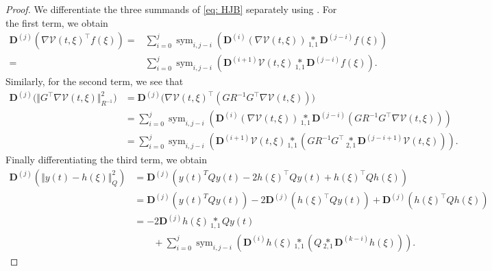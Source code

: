 \documentclass[10pt,a4paper]{amsart}
\DeclareMathOperator{\Sym}{sym}
\newcommand{\TenDeriv}[1]{\mathbf{D}^{(#1)}}
\newcommand{\tenp}[2]{\underset{#1,#2}{*}}
\begin{document}
\begin{proof}
  We differentiate the three summands of \eqref{eq: HJB} separately using . 
  For the first term, we obtain
  \begin{align*}
    \TenDeriv{j} \left(  \nabla \mathcal{V}(t,\xi)^\top f(\xi)\right) =& \sum_{i=0}^{j} \Sym_{i,j-i} \left( \TenDeriv{i} \left( \nabla \mathcal{V}(t,\xi) \right) \tenp{1}{1} \TenDeriv{j-i}f(\xi) \right) \\
    =&  \sum_{i=0}^{j} \Sym_{i,j-i} \left( \TenDeriv{i+1} \mathcal{V}(t,\xi) \tenp{1}{1} \TenDeriv{j-i}f(\xi) \right).
  \end{align*}
  Similarly, for the second term, we see that
  \begin{align*}
    \TenDeriv{j}\bigl(\Vert G^\top \nabla \mathcal{V}(t,\xi) \Vert_{R^{-1}}^2 \bigr) &=
    \TenDeriv{j}\bigl( \nabla \mathcal{V}(t,\xi)^\top  (  G R^{-1}G^\top  \nabla \mathcal{V}(t,\xi) ) \bigr) \\
    &= \sum_{i=0}^{j} \Sym_{i,j-i} \left( \TenDeriv{i} \left( \nabla \mathcal{V}(t,\xi) \right) \tenp{1}{1} \TenDeriv{j-i}\left( G R^{-1}G^\top  \nabla \mathcal{V}(t,\xi) \right)  \right)\\
    &= \sum_{i=0}^{j}\Sym_{i,j-i} \left( \TenDeriv{i+1}  \mathcal{V}(t,\xi) \tenp{1}{1} \left(G R^{-1}G^\top \tenp{2}{1}\TenDeriv{j-i+1} \mathcal{V}(t,\xi) \right)  \right).
  \end{align*}
  Finally differentiating the third term, we obtain
  \begin{align*}
      \TenDeriv{j}\left(\Vert y(t) - h(\xi) \Vert_{Q}^2\right) 
      &= \TenDeriv{j}\left( y(t)^T Q y(t) -2  h(\xi)^\top Q y(t) + h(\xi)^\top Q h(\xi) \right)
      \\
      &= \TenDeriv{j}\left( y(t)^T Q y(t)\right) -2  \TenDeriv{j}\left(h(\xi)^\top Q y(t)\right) + \TenDeriv{j}\left(h(\xi)^\top Q h(\xi) \right)
      \\ 
      &= -2   \TenDeriv{j} h(\xi) \tenp{1}{1} Q y(t) 
      \\
      & \qquad + \sum_{i=0}^{j} \Sym_{i,j-i} \left(\TenDeriv{i} h(\xi) \tenp{1}{1} \left(Q \tenp{2}{1} \TenDeriv{k-i} h(\xi)\right) \right).
  \end{align*}
\end{proof}
\end{document}
